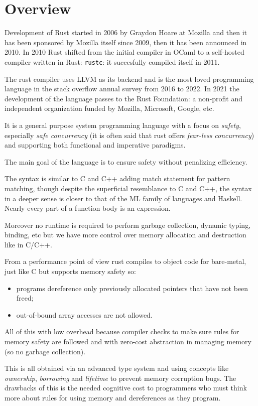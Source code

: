 \section{Overview}
Development of Rust started in 2006 by Graydon Hoare at Mozilla and then it has been sponsored by Mozilla itself since 2009, then it has been announced in 2010.
In 2010 Rust shifted from the initial compiler in OCaml to a self-hosted compiler written in Rust: \verb|rustc|: it succesfully compiled itself in 2011.

The rust compiler uses LLVM as its backend and is the most loved programming language in the stack overflow annual survey from 2016 to 2022.
In 2021 the development of the language passes to the Rust Foundation: a non-profit and independent organization funded by Mozilla, Microsoft, Google, etc.

It is a general purpose system programming language with a focus on \emph{safety}, especially \emph{safe concurrency} (it is often said that rust offers \emph{fear-less concurrency}) and supporting both functional and imperative paradigms.

The main goal of the language is to ensure safety without penalizing efficiency.

The syntax is similar to C and C++ adding match statement for pattern matching, though despite the superficial resemblance to C and C++, the syntax in a deeper sense is closer to that of the ML family of languages and Haskell.
Nearly every part of a function body is an expression.

Moreover no runtime is required to perform garbage collection, dynamic typing, binding, etc but we have more control over memory allocation and destruction like in C/C++.

From a performance point of view rust compiles to object code for bare-metal, just like C but supports memory safety so:
\begin{itemize}
    \item programs dereference only previously allocated pointers that have not been freed;
    \item out-of-bound array accesses are not allowed.
\end{itemize}
All of this with low overhead because compiler checks to make sure rules for memory safety are followed and with zero-cost abstraction in managing memory (so no garbage collection).

This is all obtained via an advanced type system and using concepts like \emph{ownership}, \emph{borrowing} and \emph{lifetime} to prevent memory corruption bugs.
The drawbacks of this is the needed cognitive cost to programmers who must think more about rules for using memory and dereferences as they program.

